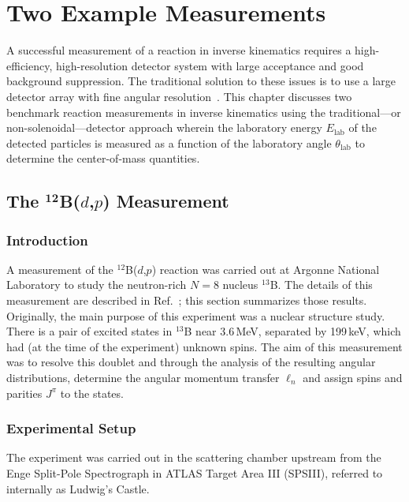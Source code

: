 \chapter{Two Example Measurements}
\label{standards}
A successful measurement of a reaction in inverse kinematics requires a high-efficiency, high-resolution detector system with large acceptance and good background suppression.  The traditional solution to these issues is to use a large detector array with fine angular resolution~\cite{Pollacco_2005,Catford_2005,Demonchy_2007,Kanungo_2010}.  This chapter discusses two benchmark reaction measurements in inverse kinematics using the traditional---or non-solenoidal---detector approach wherein the laboratory energy $E_\mathrm{lab}$ of the detected particles is measured as a function of the laboratory angle $\theta_\mathrm{lab}$ to determine the center-of-mass quantities.

\section[\texorpdfstring{The $^\text{12}$B\lowercase{($d$,$p$)} Measurement}{The 12B(d,p) Measurement}]{\texorpdfstring{The $^\mathbf{12}$B($d$,$p$) Measurement}{The 12B(d,p) Measurement}}
\subsection{Introduction}
\label{b12intro}
A measurement of the $^{12}$B($d$,$p$) reaction was carried out at Argonne National Laboratory to study the neutron-rich $N=8$ nucleus $^{13}$B.  The details of this measurement are described in Ref.~\cite{Lee_2010}; this section summarizes those results.  Originally, the main purpose of this experiment was a nuclear structure study.  There is a pair of excited states in $^{13}$B near 3.6\,MeV, separated by 199\,keV, which had (at the time of the experiment) unknown spins. %
  The aim of this measurement was to resolve this doublet and through the analysis of the resulting angular distributions, determine the angular momentum transfer $\ell_n$ and assign spins and parities $J^\pi$ to the states.

\subsection{Experimental Setup}
The experiment was carried out in the scattering chamber upstream from the Enge Split-Pole Spectrograph in ATLAS Target Area III (SPSIII), referred to internally as Ludwig's Castle.  
